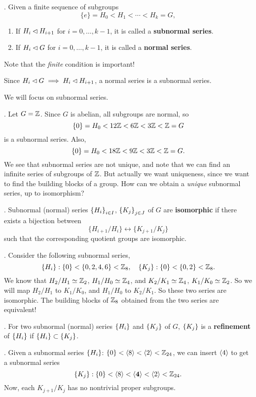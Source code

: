 . Given a finite sequence of subgroups
\[
    \{e\} = H_0 < H_1 < \cdots < H_k = G,
\]
\begin{enumerate}
    \item {} If \(H_i \lhd H_{i+1}\) for \(i = 0, \dots, k - 1\), it is called a \textbf{subnormal series}.
    \item {} If \(H_i \lhd G\) for \(i = 0, \dots, k - 1\), it is called a \textbf{normal series}.
\end{enumerate}

Note that the \textit{finite} condition is important!

\rmk Since \(H_i \lhd G \implies H_i \lhd H_{i+1}\), a normal series is a subnormal series.

We will focus on subnormal series.

\ex. Let \(G = \mathbb{Z}\). Since \(G\) is abelian, all subgroups are normal, so
\[
    \{0\} = H_0 < 12\mathbb{Z} < 6\mathbb{Z} < 3\mathbb{Z} < \mathbb{Z} = G
\]
is a subnormal series. Also,
\[
    \{0\} = H_0 < 18\mathbb{Z} < 9\mathbb{Z} < 3\mathbb{Z} < \mathbb{Z} = G.
\]
We see that subnormal series are not unique, and note that we can find an infinite series of subgroups of \(\mathbb{Z}\). But actually we want uniqueness, since we want to find the building blocks of a group. How can we obtain a \textit{unique} subnormal series, up to isomorphism?

. Subnormal (normal) series \(\left\{ H_i \right\}_{i \in I}\), \(\left\{ K_j \right\}_{j \in J}\) of \(G\) are \textbf{isomorphic} if there exists a bijection between
\[
    \{H_{i+1} / H_i\} \longleftrightarrow \{K_{j+1} / K_j\}
\]
such that the corresponding quotient groups are isomorphic.

\ex. Consider the following subnormal series,
\[
    \{H_i\} : \{0\} < \{0, 2, 4, 6\} < \mathbb{Z}_8, \quad \{K_j\} : \{0\} < \{0, 2\} < \mathbb{Z}_8.
\]
We know that \(H_2 / H_1 \simeq \mathbb{Z}_2\), \(H_1 / H_0 \simeq \mathbb{Z}_4\), and \(K_2 / K_1 \simeq \mathbb{Z}_4\), \(K_1 / K_0 \simeq \mathbb{Z}_2\). So we will map \(H_2 / H_1\) to \(K_1 / K_0\), and \(H_1 / H_0\) to \(K_2 / K_1\). So these two series are isomorphic. The building blocks of \(\mathbb{Z}_8\) obtained from the two series are equivalent!

.  For two subnormal (normal) series \(\left\{ H_i \right\}\) and \(\left\{ K_j \right\}\) of \(G\), \(\left\{ K_j \right\}\) is a \textbf{refinement} of \(\left\{ H_i \right\}\) if \(\left\{ H_i \right\} \subset \left\{ K_j \right\}\).

\ex. Given a subnormal series \(\left\{ H_i \right\}\): \(\{0\} < \left\langle 8 \right\rangle < \left\langle 2 \right\rangle < \mathbb{Z}_{24}\), we can insert \(\left\langle 4 \right\rangle\) to get a subnormal series
\[
    \left\{ K_j \right\}: \{0\} < \left\langle 8 \right\rangle < \mathbf{\left\langle 4 \right\rangle} < \left\langle 2 \right\rangle < \mathbb{Z}_{24}.
\]
Now, each \(K_{j+1} / K_j\) has no nontrivial proper subgroups.

